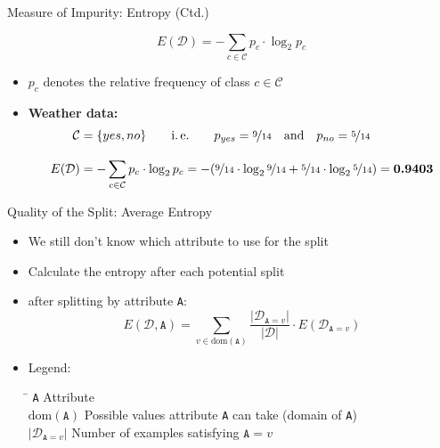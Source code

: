 \begin{frame}{Measure of Impurity: Entropy (Ctd.)}{}\important
	\vspace*{2mm}
	\begin{boxBlueNoFrame}
		\begin{equation}
			E(\mathcal{D}) = -\sum_{c \in \mathcal{C}} p_c \cdot \log_2 p_c
		\end{equation}
	\end{boxBlueNoFrame}

	\begin{itemize}
		\item $p_c$ denotes the relative frequency of class $c \in \mathcal{C}$	
		\item \textbf{Weather data:}
		\begin{align*}
			\mathcal{C} &= \{ yes, no \} \qquad \text{i.\,e.} \qquad
				p_{yes} = \nicefrac{9}{14} \quad \text{and} \quad p_{no} = \nicefrac{5}{14} \\[3mm]
			E(\mathcal{D})
				&= -\sum_{c \in \mathcal{C}} p_c \cdot \log_2 p_c
	       		   	= - (\nicefrac{9}{14} \cdot \log_2 \nicefrac{9}{14} + \nicefrac{5}{14} \cdot \log_2 \nicefrac{5}{14})
				= \boldsymbol{0.9403}
		\end{align*}
	\end{itemize}
\end{frame}


\begin{frame}{Quality of the Split: Average Entropy}{}
	\begin{itemize}
		\item We still don't know which attribute to use for the split
		\item Calculate the entropy after each potential split
		\item {} after splitting by attribute \texttt{A}:
		\begin{equation}
			E(\mathcal{D}, \texttt{A})
				= \sum_{v \in \text{dom}(\texttt{A})}
					\frac{\vert \mathcal{D}_{\texttt{A}=v} \vert}{\vert \mathcal{D} \vert} \cdot E(\mathcal{D}_{\texttt{A}=v})
		\end{equation}
		\item Legend:
		\footnotesize
		\begin{tabbing}
			\hspace*{2.5cm}\= \kill
			\texttt{A}							\>	Attribute												\\
			$\text{dom}(\texttt{A})$				\>	Possible values attribute \texttt{A} can take (domain of \texttt{A})	\\
			$\vert \mathcal{D}_{\texttt{A}=v} \vert$	\>	Number of examples satisfying $\texttt{A} = v$
		\end{tabbing}
		\normalsize
	\end{itemize}
\end{frame}


